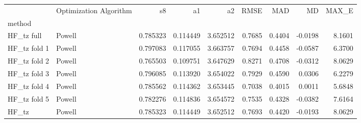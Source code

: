 \begin{tabular}{llrrrrrrr}
 & Optimization Algorithm & s8 & a1 & a2 & RMSE & MAD & MD & MAX_E \\
method &  &  &  &  &  &  &  &  \\
HF_tz full & Powell & 0.785323 & 0.114449 & 3.652512 & 0.7685 & 0.4404 & -0.0198 & 8.1601 \\
HF_tz fold 1 & Powell & 0.797083 & 0.117055 & 3.663757 & 0.7694 & 0.4458 & -0.0587 & 6.3700 \\
HF_tz fold 2 & Powell & 0.765503 & 0.109751 & 3.647629 & 0.8271 & 0.4708 & -0.0312 & 8.0629 \\
HF_tz fold 3 & Powell & 0.796085 & 0.113920 & 3.654022 & 0.7929 & 0.4590 & 0.0306 & 6.2279 \\
HF_tz fold 4 & Powell & 0.785562 & 0.114362 & 3.653445 & 0.7038 & 0.4015 & 0.0011 & 5.6848 \\
HF_tz fold 5 & Powell & 0.782276 & 0.114836 & 3.654572 & 0.7535 & 0.4328 & -0.0382 & 7.6164 \\
HF_tz & Powell & 0.785323 & 0.114449 & 3.652512 & 0.7693 & 0.4420 & -0.0193 & 8.0629 \\
\end{tabular}
